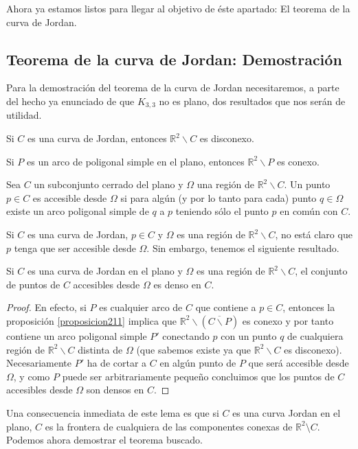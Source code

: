 Ahora ya estamos listos para llegar al objetivo de éste apartado: El teorema de la curva de Jordan.

\subsection{Teorema de la curva de Jordan: Demostración}

Para la demostración del teorema de la curva de Jordan necesitaremos, a parte del hecho ya enunciado de que $K_{3,3}$ no es plano, dos resultados que nos serán de utilidad.

\begin{lemma}\label{proposicion26}
	Si $C$ es una curva de Jordan, entonces $\mathbb{R}^{2} \backslash C$ es disconexo.
\end{lemma}
	
\begin{proposition}\label{proposicion211}
	Si $P$ es un arco de poligonal simple en el plano, entonces $\mathbb{R}^2 \backslash P$ es conexo.
\end{proposition}

\begin{definition}
	Sea $C$ un subconjunto cerrado del plano y $\Omega$ una región de $\mathbb{R}^2 \backslash C$. Un punto $p \in C$ es accesible desde $\Omega$ si para algún (y por lo tanto para cada) punto $q \in \Omega$ existe un arco poligonal simple de $q$ a $p$ teniendo sólo el punto $p$ en común con $C$.
\end{definition}

Si $C$ es una curva de Jordan, $p\in C$ y $\Omega$ es una región de  $\mathbb{R}^2 \backslash C$,  no está claro que $p$ tenga que ser accesible desde $\Omega$. Sin embargo, tenemos el siguiente resultado.

\begin{lemma}
Si $C$ es una curva de Jordan en el plano y $\Omega$ es una región de  $\mathbb{R}^2 \backslash C$, el conjunto de puntos de $C$  accesibles desde $\Omega$  es denso en $C$.
\end{lemma}
\begin{proof} En efecto, si $P$ es cualquier arco de $C$ que contiene a $p\in C$, entonces la proposición \ref{proposicion211} implica que $\mathbb{R}^2 \backslash (\overline{C \backslash P})$ es conexo y por tanto contiene un arco poligonal simple $P'$ conectando $p$ con un punto  $q$ de cualquiera región de $\mathbb{R}^2 \backslash C$ distinta de $\Omega$ (que sabemos existe ya que $\mathbb{R}^2 \backslash C$  es disconexo). Necesariamente  $P'$ ha de cortar a $C$ en algún punto de $P$ que será accesible desde $\Omega$, y como $P$ puede ser  arbitrariamente pequeño  concluimos que los puntos de $C$ accesibles desde $\Omega$ son densos en $C$. 
\end{proof}
Una consecuencia inmediata de este lema es que si $C$ es una curva Jordan  en el plano, $C$ es la frontera de cualquiera de las componentes conexas de $\mathbb{R}^2\setminus C$.
Podemos ahora demostrar el teorema buscado.

